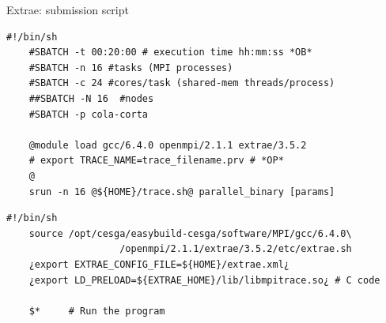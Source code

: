 \documentclass[10pt,xcolor=table]{beamer}
\begin{document}



\begin{frame}[fragile]{Extrae: submission script}

  \vspace*{-0.8cm}
  \begin{lstlisting}[style=shell,gobble=3,caption={submit\_trace.sh}]
    #!/bin/sh
    #SBATCH -t 00:20:00 # execution time hh:mm:ss *OB*
    #SBATCH -n 16 #tasks (MPI processes)
    #SBATCH -c 24 #cores/task (shared-mem threads/process)
    ##SBATCH -N 16  #nodes
    #SBATCH -p cola-corta

    @module load gcc/6.4.0 openmpi/2.1.1 extrae/3.5.2
    # export TRACE_NAME=trace_filename.prv # *OP*
    @
    srun -n 16 @${HOME}/trace.sh@ parallel_binary [params]
  \end{lstlisting}

  \pause

  \vspace*{-0.8cm}
  \begin{lstlisting}[style=shell,gobble=3,caption={trace.sh}]
    #!/bin/sh
    source /opt/cesga/easybuild-cesga/software/MPI/gcc/6.4.0\
                    /openmpi/2.1.1/extrae/3.5.2/etc/extrae.sh
    ¿export EXTRAE_CONFIG_FILE=${HOME}/extrae.xml¿
    ¿export LD_PRELOAD=${EXTRAE_HOME}/lib/libmpitrace.so¿ # C code

    $*     # Run the program
  \end{lstlisting}
\end{frame}
\end{document}
